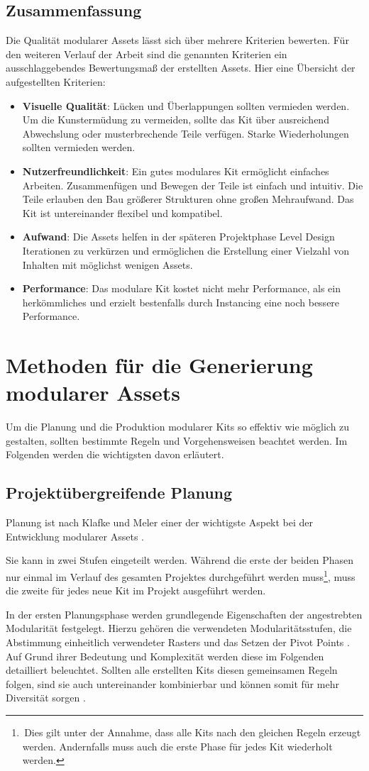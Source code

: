 \subsection{Zusammenfassung}
Die Qualität modularer Assets lässt sich über mehrere Kriterien bewerten. Für den weiteren Verlauf der Arbeit sind die genannten Kriterien ein ausschlaggebendes Bewertungsmaß der erstellten Assets. Hier eine Übersicht der aufgestellten Kriterien:
\begin{itemize}
\item \textbf{Visuelle Qualität}: Lücken und Überlappungen sollten vermieden werden. Um die Kunstermüdung zu vermeiden, sollte das Kit über ausreichend Abwechslung oder musterbrechende Teile verfügen. Starke Wiederholungen sollten vermieden werden.
\item \textbf{Nutzerfreundlichkeit}: Ein gutes modulares Kit ermöglicht einfaches Arbeiten. Zusammenfügen und Bewegen der Teile ist einfach und intuitiv. Die Teile erlauben den Bau größerer Strukturen ohne großen Mehraufwand. Das Kit ist untereinander flexibel und kompatibel.
\item \textbf{Aufwand}: Die Assets helfen in der späteren Projektphase Level Design Iterationen zu verkürzen und ermöglichen die Erstellung einer Vielzahl von Inhalten mit möglichst wenigen Assets.
\item \textbf{Performance}: Das modulare Kit kostet nicht mehr Performance, als ein herkömmliches und erzielt bestenfalls durch Instancing eine noch bessere Performance.
\end{itemize}
\newpage
\section{Methoden für die Generierung modularer Assets}
Um die Planung und die Produktion modularer Kits so effektiv wie möglich zu gestalten, sollten bestimmte Regeln und Vorgehensweisen beachtet werden. Im Folgenden werden die wichtigsten davon erläutert.
\subsection{Projektübergreifende Planung}
Planung ist nach Klafke und Meler einer der wichtigste Aspekt bei der Entwicklung modularer Assets \parencite{Klafke,Meler}.
\par
Sie kann in zwei Stufen eingeteilt werden. Während die erste der beiden Phasen nur einmal im Verlauf des gesamten Projektes durchgeführt werden muss\footnote{\,Dies gilt unter der Annahme, dass alle Kits nach den gleichen Regeln erzeugt werden. Andernfalls muss auch die erste Phase für jedes Kit wiederholt werden.}, muss die zweite für jedes neue Kit im Projekt ausgeführt werden. \parencite{Burgess}
\par
In der ersten Planungsphase werden grundlegende Eigenschaften der angestrebten Modularität festgelegt. Hierzu gehören die verwendeten Modularitätsstufen, die Abstimmung einheitlich verwendeter Rasters \parencite{Perry} und das Setzen der Pivot Points \parencite{Mader}. Auf Grund ihrer Bedeutung und Komplexität werden diese im Folgenden detailliert beleuchtet. Sollten alle erstellten Kits diesen gemeinsamen Regeln folgen, sind sie auch untereinander kombinierbar und können somit für mehr Diversität sorgen \parencite{Burgess}.
